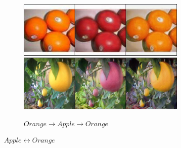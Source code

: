 \documentclass[10pt,twocolumn,letterpaper]{article}
\begin{document}
\begin{figure}[!htb]
\begin{subfigure}[]{0.49\textwidth}
         \vspace{0.3cm}
		 \includegraphics[width=0.9\textwidth]{test_b_2_a_214}\\
		 \vspace{0.3cm}
		 \includegraphics[width=0.9\textwidth]{test_b_2_a_243}
		 \caption{$Orange \rightarrow Apple \rightarrow Orange$}
         \label{fig:orange2apple}
     \end{subfigure}

     \caption{$Apple \leftrightarrow Orange$}
     \label{fig:orange22apple}
\end{figure} 
\end{document}
